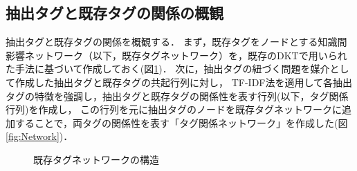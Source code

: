 \subsection{抽出タグと既存タグの関係の概観}
抽出タグと既存タグの関係を概観する．
まず，既存タグをノードとする知識間影響ネットワーク（以下，既存タグネットワーク）を，既存のDKTで用いられた手法に基づいて作成しておく(図\ref{fig:SimpleNetwork})．
次に，抽出タグの紐づく問題を媒介として作成した抽出タグと既存タグの共起行列に対し，
TF-IDF法を適用して各抽出タグの特徴を強調し，抽出タグと既存タグの関係性を表す行列(以下，タグ関係行列)を作成し，
この行列を元に抽出タグのノードを既存タグネットワークに追加することで，両タグの関係性を表す「タグ関係ネットワーク」を作成した(図\ref{fig:Network})．


\begin{figure}[H]
\begin{center}
\hspace*{-20pt}
\end{center}
\caption{既存タグネットワークの構造}
\label{fig:SimpleNetwork}
\end{figure}

